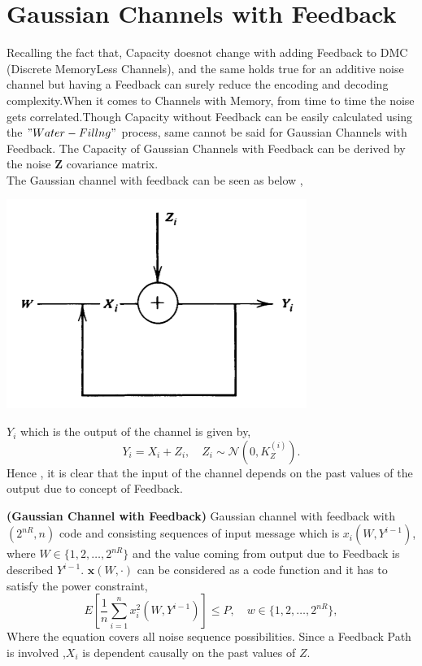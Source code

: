 \section{Gaussian Channels with Feedback}
Recalling the fact that, Capacity doesnot change with adding Feedback to DMC (Discrete MemoryLess Channels), and the same holds true for an additive noise channel but having a Feedback can surely reduce the encoding and decoding complexity.When it comes to Channels with Memory, from time to time the noise gets correlated.Though Capacity without Feedback can be easily calculated using the $"Water - Fillng"$ process, same cannot be said for Gaussian Channels with Feedback.
The Capacity of Gaussian Channels with Feedback can be derived by the noise $\mathbf{Z}$  covariance matrix.
\\
The Gaussian channel with feedback can be seen as below ,
\begin{center}
	\includegraphics[scale=0.5]{Diagrams/Gaussian_Channel_with_FeedBack.png}
\end{center} 
 $Y_i$ which is the output of the channel is given by,
\begin{equation}
Y_i = X_i + Z_i, \quad Z_i \sim \mathcal{N}(0, K_Z^{(i)}). \label{eq:10.96}
\end{equation}
Hence , it is clear that the input of the channel depends on the past values of the output due to concept of Feedback.
%
\begin{tcolorbox}[boxrule=0pt,frame hidden,sharp corners,enhanced, opacityback=0, borderline west={2pt}{0pt}{red}]
\begin{defn} \textbf{(Gaussian Channel with Feedback)}
Gaussian channel with feedback with $(2^{nR}, n)$ code and consisting sequences of input message which is $x_i(W, Y^{i-1})$, where $W \in \{1, 2, \dots, 2^{nR}\}$ and the value coming from output due to Feedback is described $Y^{i-1}$. 
$\mathbf{x}(W, \cdot)$ can be considered as a code function and it has to satisfy the power constraint,
\begin{equation}
E\left[\frac{1}{n} \sum_{i=1}^n x_i^2(W, Y^{i-1})\right] \leq P, \quad w \in \{1, 2, \dots, 2^{nR}\}, \label{eq:10.97}
\end{equation}
Where the equation covers all noise sequence possibilities.
Since a Feedback Path is involved ,$X_i$ is dependent causally on the past values of ${Z}$.
\end{defn}
\end{tcolorbox}
%
